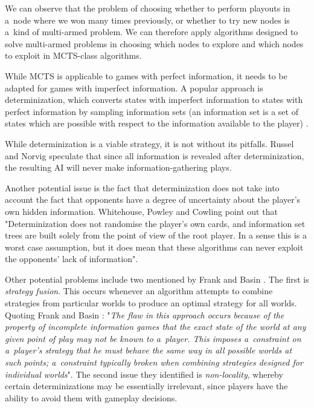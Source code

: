 We can observe that the problem of choosing whether to perform playouts in a~node
where we won many times previously, or whether to try new nodes is a~kind of
multi-armed problem. We can therefore apply algorithms designed to solve
multi-armed problems in choosing which nodes to explore and which nodes
to exploit in MCTS-class algorithms.

While MCTS is applicable to games with perfect information, it needs to be adapted
for games with imperfect information. A popular approach is determinization,
which converts states with imperfect information to states with perfect information
by sampling information sets (an information set is a set of states
which are possible with respect to the information available to the player)
\cite{Cowling12}.

While determinization is a viable strategy, it is not without its pitfalls.
Russel and Norvig \cite{Russell09} speculate that since all information is revealed after
determinization, the resulting AI will never make information-gathering
plays.

Another potential issue is the fact that determinization does not take into account
the fact that opponents have a degree of uncertainty about the player's own hidden information.
Whitehouse, Powley and Cowling \cite{Whitehouse11} point out that "Determinization
does not randomise the player's own cards, and information set trees are built solely
from the point of view of the root player. In a sense this is a
worst case assumption, but it does mean that these
algorithms can never exploit the opponents' lack of
information".

Other potential problems include two mentioned by Frank and Basin \cite{Frank98}.
The first is \emph{strategy fusion}. This occurs whenever an algorithm attempts to combine
strategies from particular worlds to produce an optimal strategy for all worlds.
Quoting Frank and Basin \cite{Frank98}: "\emph{The flaw in this approach
occurs because of the property of incomplete information games that the exact state
of the world at any given point of play may not be known to a~player. This imposes
a~constraint on a~player's strategy that he must behave the same way in all possible
worlds at such points; a~constraint typically broken when combining strategies designed
for individual worlds}". The second issue they identified is \emph{non-locality},
whereby certain determinizations may be essentially irrelevant, since players have
the ability to avoid them with gameplay decisions.

